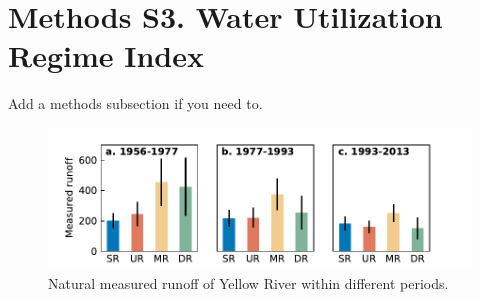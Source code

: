 \documentclass[9pt,twoside,lineno]{pnas-new}
\begin{document}
\section*{Methods S3. Water Utilization Regime Index}
Add a methods subsection if you need to.


\begin{figure}
\centering
\includegraphics[width=\textwidth]{../../figures/supplementary_information/sf_measured_runoff.pdf}
\caption{Natural measured runoff of Yellow River within different periods.}
\end{figure}
\end{document}
